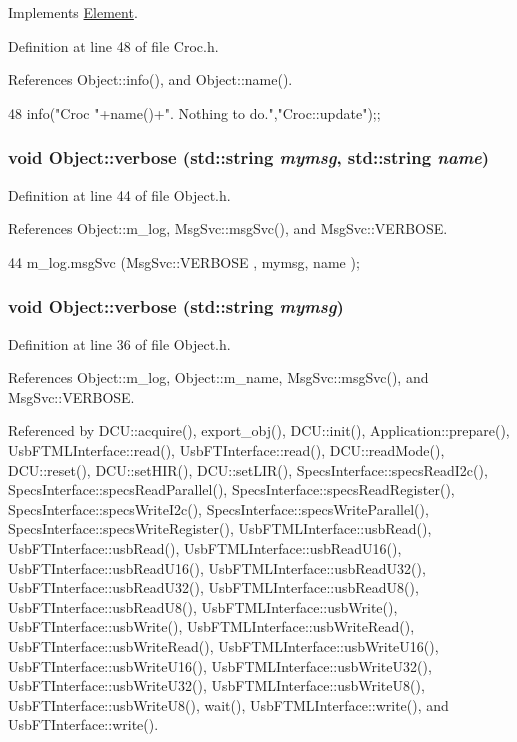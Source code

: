 Implements \hyperlink{classElement_a4e6c83efae95616ebddd03c793a26661}{Element}.

Definition at line 48 of file Croc.h.

References Object::info(), and Object::name().


\begin{DoxyCode}
48 {info("Croc "+name()+". Nothing to do.","Croc::update");};
\end{DoxyCode}
\hypertarget{classObject_a2d4120195317e2a3c6532e8bb9f3da68}{
\subsubsection[{verbose}]{\setlength{\rightskip}{0pt plus 5cm}void Object::verbose (std::string {\em mymsg}, \/  std::string {\em name})}}
\label{classObject_a2d4120195317e2a3c6532e8bb9f3da68}


Definition at line 44 of file Object.h.

References Object::m\_\-log, MsgSvc::msgSvc(), and MsgSvc::VERBOSE.


\begin{DoxyCode}
44 { m_log.msgSvc (MsgSvc::VERBOSE , mymsg, name ); }
\end{DoxyCode}
\hypertarget{classObject_a83d2db2df682907ea1115ad721c1c4a1}{
\subsubsection[{verbose}]{\setlength{\rightskip}{0pt plus 5cm}void Object::verbose (std::string {\em mymsg})}}
\label{classObject_a83d2db2df682907ea1115ad721c1c4a1}


Definition at line 36 of file Object.h.

References Object::m\_\-log, Object::m\_\-name, MsgSvc::msgSvc(), and MsgSvc::VERBOSE.

Referenced by DCU::acquire(), export\_\-obj(), DCU::init(), Application::prepare(), UsbFTMLInterface::read(), UsbFTInterface::read(), DCU::readMode(), DCU::reset(), DCU::setHIR(), DCU::setLIR(), SpecsInterface::specsReadI2c(), SpecsInterface::specsReadParallel(), SpecsInterface::specsReadRegister(), SpecsInterface::specsWriteI2c(), SpecsInterface::specsWriteParallel(), SpecsInterface::specsWriteRegister(), UsbFTMLInterface::usbRead(), UsbFTInterface::usbRead(), UsbFTMLInterface::usbReadU16(), UsbFTInterface::usbReadU16(), UsbFTMLInterface::usbReadU32(), UsbFTInterface::usbReadU32(), UsbFTMLInterface::usbReadU8(), UsbFTInterface::usbReadU8(), UsbFTMLInterface::usbWrite(), UsbFTInterface::usbWrite(), UsbFTMLInterface::usbWriteRead(), UsbFTInterface::usbWriteRead(), UsbFTMLInterface::usbWriteU16(), UsbFTInterface::usbWriteU16(), UsbFTMLInterface::usbWriteU32(), UsbFTInterface::usbWriteU32(), UsbFTMLInterface::usbWriteU8(), UsbFTInterface::usbWriteU8(), wait(), UsbFTMLInterface::write(), and UsbFTInterface::write().


